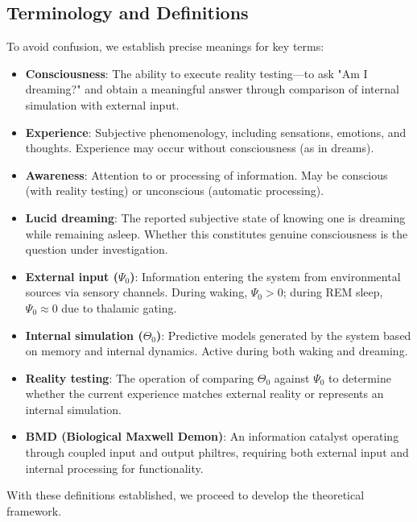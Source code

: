 \documentclass[11pt,a4paper]{article}
\begin{document}
\subsection{Terminology and Definitions}

To avoid confusion, we establish precise meanings for key terms:

\begin{itemize}
\item \textbf{Consciousness}: The ability to execute reality testing—to ask "Am I dreaming?" and obtain a meaningful answer through comparison of internal simulation with external input.

\item \textbf{Experience}: Subjective phenomenology, including sensations, emotions, and thoughts. Experience may occur without consciousness (as in dreams).

\item \textbf{Awareness}: Attention to or processing of information. May be conscious (with reality testing) or unconscious (automatic processing).

\item \textbf{Lucid dreaming}: The reported subjective state of knowing one is dreaming while remaining asleep. Whether this constitutes genuine consciousness is the question under investigation.

\item \textbf{External input ($\Psi_0$)}: Information entering the system from environmental sources via sensory channels. During waking, $\Psi_0 > 0$; during REM sleep, $\Psi_0 \approx 0$ due to thalamic gating.

\item \textbf{Internal simulation ($\Theta_0$)}: Predictive models generated by the system based on memory and internal dynamics. Active during both waking and dreaming.

\item \textbf{Reality testing}: The operation of comparing $\Theta_0$ against $\Psi_0$ to determine whether the current experience matches external reality or represents an internal simulation.

\item \textbf{BMD (Biological Maxwell Demon)}: An information catalyst operating through coupled input and output philtres, requiring both external input and internal processing for functionality.
\end{itemize}

With these definitions established, we proceed to develop the theoretical framework.
\end{document}
